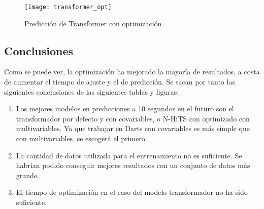 \begin{figure}[H]
    \centering
    \texttt{[image: transformer\_opt]}
    \caption{Predicción de Transformer con optimización}\label{fig:transformer_opt}
\end{figure}


\subsection{Conclusiones}



Como se puede ver, la optimización ha mejorado la mayoría de resultados, a costa de aumentar el tiempo de
ajuste y el de predicción. Se sacan por tanto las siguientes conclusiones de las siguientes tablas y figuras:
\begin{enumerate}
    \item Los mejores modelos en predicciones a 10 segundos en el futuro son el transformador por defecto y 
        con covariables, o N-HiTS con optimizado con multivariables. Ya que trabajar en Darts con covariables 
        es más simple que con multivariables, se escogerá el primero.
    \item La cantidad de datos utilizada para el entrenamiento no es suficiente. Se habrían podido conseguir mejores
        resultados con un conjunto de datos más grande.
    \item El tiempo de optimización en el caso del modelo transformador no ha sido suficiente.
\end{enumerate}

